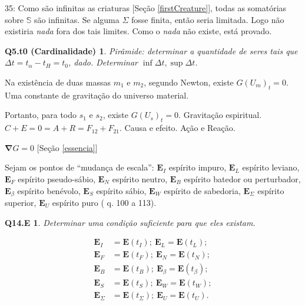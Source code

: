 \documentclass[12pt,a4paper]{article}
\begin{document}
			\cite{le} 35: Como s\~ao infinitas as criaturas [Se\c{c}\~ao \ref{firstCreature}], todas as somat\'orias sobre $\mathbb{S}$ s\~ao infinitas. Se alguma $\Sigma$ fosse finita, ent\~ao seria limitada. Logo n\~ao existiria \emph{nada} fora dos tais limites. Como o \emph{nada} n\~ao existe, est\'a provado.

		\newtheorem{Q5.t0}{Q5.t0 (Cardinalidade)}
			\begin{Q5.t0} Pir\^amide: determinar a quantidade de seres tais que $ \Delta t = t_\alpha - t_H = t_0 $, dado. Determinar $ \inf \Delta t, \sup \Delta t$.
			\end{Q5.t0}

			Na exist\^encia de duas massas $m_1$ e $m_2$, segundo Newton, existe $G(U_m)_t = 0$. Uma constante de gravita\c{c}\~ao do universo material.

			Portanto, para todo $s_1$ e $s_2$, existe $G(U_s)_t = 0$. Gravita\c{c}\~ao espiritual. $C + E = 0 = A + R = F_{12} + F_{21}$. Causa e efeito. A\c{c}\~ao e Rea\c{c}\~ao.

			$\mathbf{\nabla} G = 0$	[Se\c{c}\~ao \ref{essencia}]

			\begin{flushright}
			\end{flushright}

			Sejam os pontos de \textquotedblleft mudan\c{c}a de escala\textquotedblright: $ \mathbf{E}_I $ esp\'irito impuro, $ \mathbf{E}_L $ esp\'irito leviano, $ \mathbf{E}_F $ esp\'irito pseudo-s\'abio, $ \mathbf{E}_N $ esp\'irito neutro, $ \mathbf{E}_B $ esp\'irito batedor ou perturbador, $ \mathbf{E}_\beta $ esp\'irito ben\'evolo, $ \mathbf{E}_S $ esp\'irito s\'abio, $ \mathbf{E}_W $ esp\'irito de sabedoria, $ \mathbf{E}_\Sigma $ esp\'irito superior, $ \mathbf{E}_U $ esp\'irito puro (\cite{le} q. 100 a 113).

			\newtheorem{Q14.E}{Q14.E}
			\begin{Q14.E} Determinar uma condi\c{c}\~ao suficiente para que eles existam.
			\end{Q14.E}

			\begin{align*}
				\mathbf{E}_I &= \mathbf{E}\left(t_I\right); \
				\mathbf{E}_L = \mathbf{E}\left(t_L\right); \\
				\mathbf{E}_F &= \mathbf{E}\left(t_F\right); \
				\mathbf{E}_N = \mathbf{E}\left(t_N\right); \\
				\mathbf{E}_B &= \mathbf{E}\left(t_B\right); \
				\mathbf{E}_\beta = \mathbf{E}\left(t_\beta\right); \\
				\mathbf{E}_S &= \mathbf{E}\left(t_S\right); \
				\mathbf{E}_W = \mathbf{E}\left(t_W\right); \\
				\mathbf{E}_\Sigma &= \mathbf{E}\left(t_\Sigma\right); \
				\mathbf{E}_U = \mathbf{E}\left(t_U\right).
			\end{align*}
\end{document}
